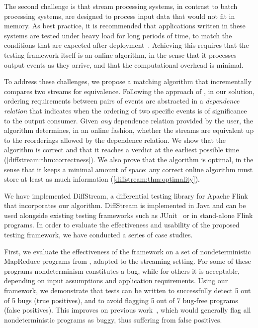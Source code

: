 The second challenge is that
stream processing systems, in contrast to batch processing systems,
are designed to process input data that would not fit
in memory.  As best practice, it is recommended that applications written in these systems are
tested under heavy load for long periods of time, to match the
conditions that are expected after
deployment~\cite{vianna2019exploratory}. Achieving this requires that
the testing framework itself is an online algorithm, in the sense that
it processes output events as they arrive, and that the computational overhead is minimal.

To address these challenges, we propose a matching algorithm that incrementally compares two streams for equivalence.
Following the approach of \cite{pldi19}, in our solution, ordering requirements between pairs of events are abstracted in a \emph{dependence relation} that indicates when the ordering of two specific events is of significance to the output consumer.
Given \emph{any} dependence relation provided by the user, the algorithm determines, in an online fashion, whether the streams are equivalent up to the reorderings allowed by the dependence relation.
We show that the algorithm is correct and that it reaches a verdict at the earliest possible time (\cref{diffstream:thm:correctness}).
We also prove that the algorithm is optimal, in the sense that it keeps a minimal amount of space: any correct online algorithm must store at least as much information (\cref{diffstream:thm:optimality}).

We have implemented DiffStream{}, a differential testing library for Apache Flink that incorporates our algorithm.
DiffStream{} is implemented in Java and can be used alongside existing
testing frameworks such as
JUnit~\cite{JUnitWeb} or in stand-alone Flink programs.
In order to evaluate the effectiveness and usability of the proposed testing framework, we have conducted a series of case studies.

First, we evaluate the effectiveness of the framework on a
set of nondeterministic MapReduce programs from \cite{xiao2014nondeterminism}, adapted to the streaming setting.
For some of these programs nondeterminism constitutes a bug, while for others it is acceptable, depending on input assumptions and application requirements.
Using our framework, we demonstrate that tests can be written to successfully detect 5 out of 5 bugs (true positives), and to avoid flagging 5 out of 7 bug-free programs (false positives).
This improves on previous work~\cite{xu2013testing}, which would generally flag all nondeterministic programs as buggy, thus suffering from false positives.

